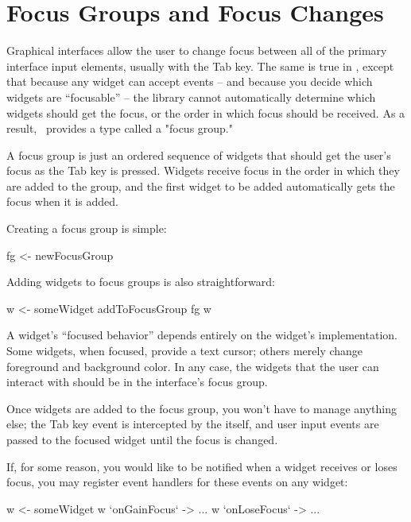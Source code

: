 \section{Focus Groups and Focus Changes}
\label{sec:focus}

Graphical interfaces allow the user to change focus between all of the
primary interface input elements, usually with the Tab key.  The same
is true in \vtyui, except that because any widget can accept events --
and because you decide which widgets are ``focusable'' -- the library
cannot automatically determine which widgets should get the focus, or
the order in which focus should be received.  As a result,
\vtyui\ provides a type called a "focus group."

A focus group is just an ordered sequence of widgets that should get the
user's focus as the Tab key is pressed.  Widgets receive focus in the
order in which they are added to the group, and the first widget to be
added automatically gets the focus when it is added.

Creating a focus group is simple:

\begin{haskellcode}
 fg <- newFocusGroup
\end{haskellcode}

Adding widgets to focus groups is also straightforward:

\begin{haskellcode}
 w <- someWidget
 addToFocusGroup fg w
\end{haskellcode}

A widget's ``focused behavior'' depends entirely on the widget's
implementation.  Some widgets, when focused, provide a text cursor;
others merely change foreground and background color.  In any case,
the widgets that the user can interact with should be in the
interface's focus group.

Once widgets are added to the focus group, you won't have to manage
anything else; the Tab key event is intercepted by the 
itself, and user input events are passed to the focused widget until
the focus is changed.

If, for some reason, you would like to be notified when a widget
receives or loses focus, you may register event handlers for these
events on any widget:

\begin{haskellcode}
 w <- someWidget
 w `onGainFocus` \this -> ...
 w `onLoseFocus` \this -> ...
\end{haskellcode}

